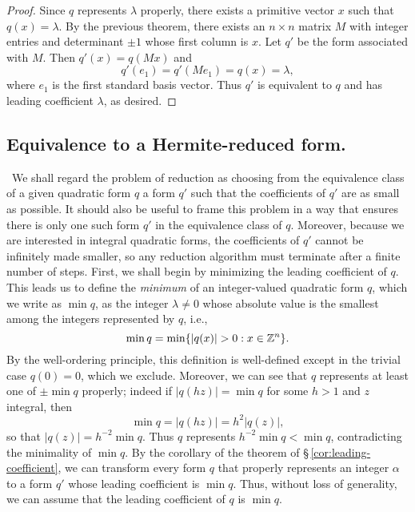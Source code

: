 \begin{proof}
  Since \(q\) represents \(\lambda\) properly, there exists a primitive vector
  \(x\) such that \(q(x) = \lambda\). By the previous theorem, there exists an
  \(n \times n\) matrix \(M\) with integer entries and determinant \(\pm 1\)
  whose first column is \(x\). Let \(q'\) be the form associated with \(M\).
  Then \(q'(x) = q(Mx)\) and
  \[
    q'(e_1) = q'(Me_1) = q(x) = \lambda,
  \]
  where \(e_1\) is the first standard basis vector. Thus \(q'\) is equivalent to
  \(q\) and has leading coefficient \(\lambda\), as desired.
\end{proof}

\subsection{Equivalence to a Hermite-reduced form.}~We shall regard the problem
of reduction as choosing from the equivalence class of a given quadratic form
\(q\) a form \(q'\) such that the coefficients of \(q'\) are as small as
possible. It should also be useful to frame this problem in a way that ensures
there is only one such form \(q'\) in the equivalence class of \(q\). Moreover,
because we are interested in integral quadratic forms, the coefficients of
\(q'\) cannot be infinitely made smaller, so any reduction algorithm must
terminate after a finite number of steps. First, we shall begin by minimizing
the leading coefficient of \(q\). This leads us to define the \emph{minimum} of
an integer-valued quadratic form \(q\), which we write as \(\min q\), as the
integer \(\lambda \neq 0\) whose absolute value is the smallest among the
integers represented by \(q\), i.e.,
  \[
    \min q = \min \{|q(x)| > 0 : x \in \mathbb{Z}^n\}.
  \]\label{sec:minimum}
By the well-ordering principle, this definition is well-defined except in the
trivial case \(q(0) = 0\), which we exclude. Moreover, we can see that \(q\)
represents at least one  of \(\pm \min q\) properly; indeed if \(|q(hz)| = \min
q\) for some \(h > 1\) and \(z\) integral, then
\[
  \min q = |q(hz)| = h^2|q(z)|,
\]
so that \(|q(z)| = h^{-2} \min q\). Thus \(q\) represents \(h^{-2} \min q < \min
q\), contradicting the minimality of \(\min q\). By the corollary of the theorem
of \S\,\ref{cor:leading-coefficient}, we can transform every form \(q\) that
properly represents an integer \(\alpha\) to a form \(q'\) whose leading
coefficient is \(\min q\). Thus, without loss of generality, we can assume that
the leading coefficient of \(q\) is \(\min q\).

